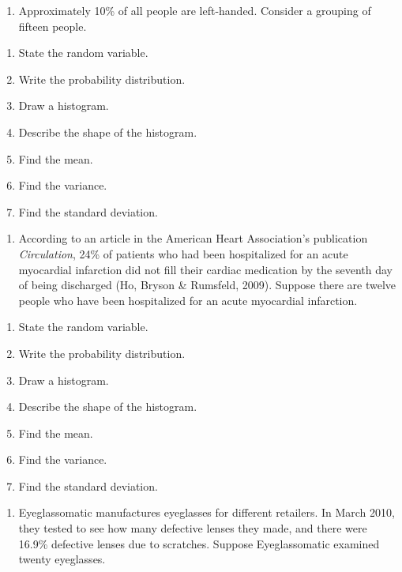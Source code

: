 \documentclass[]{book}
\providecommand{\tightlist}{%
  \setlength{\itemsep}{0pt}\setlength{\parskip}{0pt}}
\begin{document}
\begin{enumerate}
\def\labelenumi{\arabic{enumi}.}
\setcounter{enumi}{3}
\tightlist
\item
  Approximately 10\% of all people are left-handed. Consider a grouping
  of fifteen people.
\end{enumerate}

\begin{enumerate}
\def\labelenumi{\alph{enumi}.}
\item
  State the random variable.
\item
  Write the probability distribution.
\item
  Draw a histogram.
\item
  Describe the shape of the histogram.
\item
  Find the mean.
\item
  Find the variance.
\item
  Find the standard deviation.
\end{enumerate}

\begin{enumerate}
\def\labelenumi{\arabic{enumi}.}
\setcounter{enumi}{4}
\tightlist
\item
  According to an article in the American Heart Association's
  publication \emph{Circulation}, 24\% of patients who had been hospitalized
  for an acute myocardial infarction did not fill their cardiac
  medication by the seventh day of being discharged (Ho, Bryson \&
  Rumsfeld, 2009). Suppose there are twelve people who have been
  hospitalized for an acute myocardial infarction.
\end{enumerate}

\begin{enumerate}
\def\labelenumi{\alph{enumi}.}
\item
  State the random variable.
\item
  Write the probability distribution.
\item
  Draw a histogram.
\item
  Describe the shape of the histogram.
\item
  Find the mean.
\item
  Find the variance.
\item
  Find the standard deviation.
\end{enumerate}

\begin{enumerate}
\def\labelenumi{\arabic{enumi}.}
\setcounter{enumi}{5}
\tightlist
\item
  Eyeglassomatic manufactures eyeglasses for different retailers. In
  March 2010, they tested to see how many defective lenses they made,
  and there were 16.9\% defective lenses due to scratches. Suppose
  Eyeglassomatic examined twenty eyeglasses.
\end{enumerate}
\end{document}
